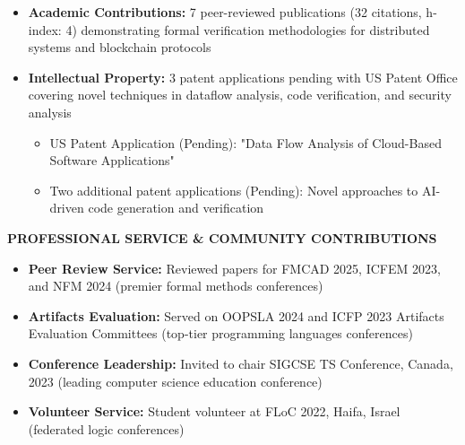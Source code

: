 \documentclass[11pt,letterpaper]{article}
\newcommand{\cvsection}[1]{
    \vspace{0.6em}
    {\color{darkblue}\textbf{\Large #1}}
    \vspace{0.15em}
    \textcolor{lightblue}{\hrulefill}
    \vspace{0.4em}
}
\begin{document}
\begin{itemize}
    \item \textbf{Academic Contributions:} 7 peer-reviewed publications (32 citations, h-index: 4) demonstrating formal verification methodologies for distributed systems and blockchain protocols
    \item \textbf{Intellectual Property:} 3 patent applications pending with US Patent Office covering novel techniques in dataflow analysis, code verification, and security analysis
          \begin{itemize}
              \item US Patent Application (Pending): "Data Flow Analysis of Cloud-Based Software Applications"
              \item Two additional patent applications (Pending): Novel approaches to AI-driven code generation and verification
          \end{itemize}
\end{itemize}

\cvsection{PROFESSIONAL SERVICE \& COMMUNITY CONTRIBUTIONS}
\begin{itemize}
    \item \textbf{Peer Review Service:} Reviewed papers for FMCAD 2025, ICFEM 2023, and NFM 2024 (premier formal methods conferences)
    \item \textbf{Artifacts Evaluation:} Served on OOPSLA 2024 and ICFP 2023 Artifacts Evaluation Committees (top-tier programming languages conferences)
    \item \textbf{Conference Leadership:} Invited to chair SIGCSE TS Conference, Canada, 2023 (leading computer science education conference)
    \item \textbf{Volunteer Service:} Student volunteer at FLoC 2022, Haifa, Israel (federated logic conferences)
\end{itemize}
\end{document}
